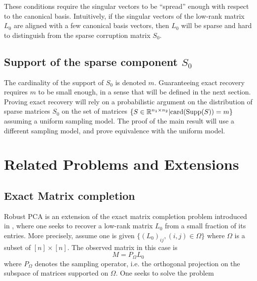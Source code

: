 \documentclass{../../common/projectreport}
\begin{document}
These conditions require the singular vectors to be ``spread'' enough with respect to the canonical basis. Intuitively, if the singular vectors of the low-rank matrix $L_0$ are aligned with a few canonical basis vectors, then $L_0$ will be sparse and hard to distinguish from the sparse corruption matrix $S_0$.



\subsection{Support of the sparse component $S_0$}
The cardinality of the support of $S_0$ is denoted $m$. Guaranteeing exact recovery requires $m$ to be small enough, in a sense that will be defined in the next section. Proving exact recovery will rely on a probabilistic argument on the distribution of sparse matrices $S_0$ on the set of matrices $\{ S \in {\mathbb R}^{n_1 \times n_2} | \text{card}(\text{Supp}(S)) = m \}$ assuming a uniform sampling model. The proof of the main result will use a different sampling model, and prove equivalence with the uniform model.









\newpage
\section{Related Problems and Extensions}


\subsection{Exact Matrix completion}
Robust PCA is an extension of the exact matrix completion problem introduced in \cite{Candes:2009uq}, where one seeks to recover a low-rank matrix $L_0$ from a small fraction of its entries. More precisely, assume one is given $\{(L_0)_{ij}, (i,j)\in \Omega\}$ where $\Omega$ is a subset of $[n]\times [n]$. The observed matrix in this case is 
\[
M = P_\Omega L_0
\]
where $P_\Omega$ denotes the sampling operator, i.e. the orthogonal projection on the subspace of matrices supported on $\Omega$. One seeks to solve the problem
\end{document}

